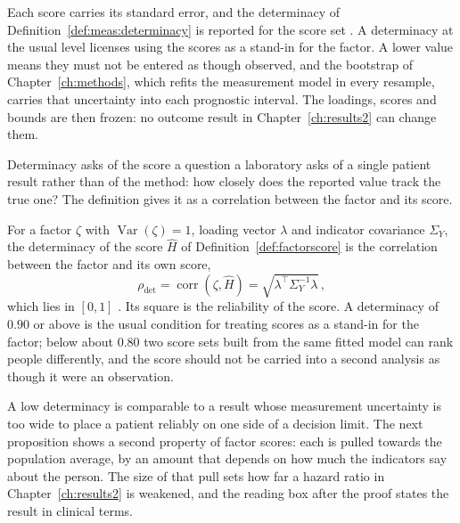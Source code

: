 Each score carries its standard error, and the determinacy of Definition~\ref{def:meas:determinacy} is reported for the score set \citep{grice_2001}. A determinacy at the usual level licenses using the scores as a stand-in for the factor. A lower value means they must not be entered as though observed, and the bootstrap of Chapter~\ref{ch:methods}, which refits the measurement model in every resample, carries that uncertainty into each prognostic interval. The loadings, scores and bounds are then frozen: no outcome result in Chapter~\ref{ch:results2} can change them.


Determinacy asks of the score a question a laboratory asks of a single patient result rather than of the method: how closely does the reported value track the true one? The definition gives it as a correlation between the factor and its score.

\begin{definition}
\label{def:meas:determinacy}
For a factor $\zeta$ with $\operatorname{Var}(\zeta)=1$, loading vector
$\lambda$ and indicator covariance $\Sigma_Y$, the determinacy of the score
$\widehat H$ of Definition~\ref{def:factorscore} is the correlation between the
factor and its own score,
\begin{equation}
  \rho_{\mathrm{det}}=\operatorname{corr}(\zeta,\widehat H)
  =\sqrt{\lambda^{\!\top}\Sigma_Y^{-1}\lambda}\,,
  \label{eq:determinacy}
\end{equation}
which lies in $[0,1]$ \citep{grice_2001}. Its square is the reliability of the
score. A determinacy of $0.90$ or above is the usual condition for treating
scores as a stand-in for the factor; below about $0.80$ two score sets built
from the same fitted model can rank people differently, and the score should
not be carried into a second analysis as though it were an observation.
\end{definition}

A low determinacy is comparable to a result whose measurement uncertainty is too wide to place a patient reliably on one side of a decision limit. The next proposition shows a second property of factor scores: each is pulled towards the population average, by an amount that depends on how much the indicators say about the person. The size of that pull sets how far a hazard ratio in Chapter~\ref{ch:results2} is weakened, and the reading box after the proof states the result in clinical terms.

